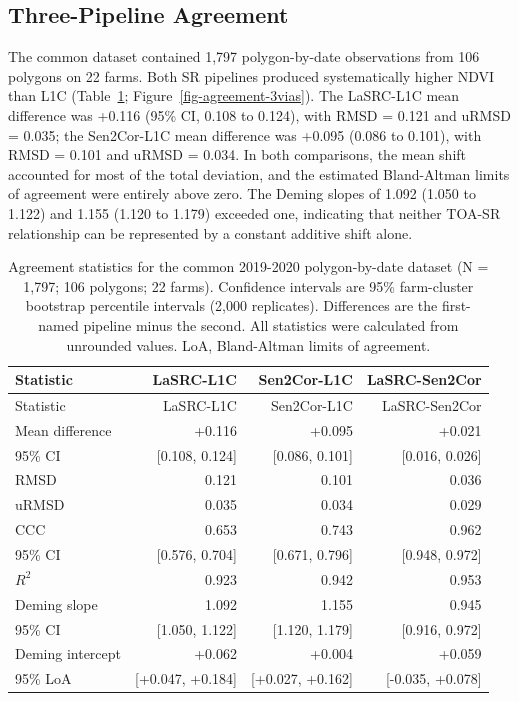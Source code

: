 \documentclass[
  authoryear,
  preprint]{elsarticle}
\begin{document}
\subsection{Three-Pipeline
Agreement}\label{sec-three-pipeline-agreement}

The common dataset contained 1,797 polygon-by-date observations from 106
polygons on 22 farms. Both SR pipelines produced systematically higher
NDVI than L1C (Table~\ref{tbl-agreement-3vias};
Figure~\ref{fig-agreement-3vias}). The LaSRC-L1C mean difference was
+0.116 (95\% CI, 0.108 to 0.124), with RMSD = 0.121 and uRMSD = 0.035;
the Sen2Cor-L1C mean difference was +0.095 (0.086 to 0.101), with RMSD =
0.101 and uRMSD = 0.034. In both comparisons, the mean shift accounted
for most of the total deviation, and the estimated Bland-Altman limits
of agreement were entirely above zero. The Deming slopes of 1.092 (1.050
to 1.122) and 1.155 (1.120 to 1.179) exceeded one, indicating that
neither TOA-SR relationship can be represented by a constant additive
shift alone.

\begin{longtable}[]{@{}lrrr@{}}
\caption{Agreement statistics for the common 2019-2020 polygon-by-date
dataset (N = 1,797; 106 polygons; 22 farms). Confidence intervals are
95\% farm-cluster bootstrap percentile intervals (2,000 replicates).
Differences are the first-named pipeline minus the second. All
statistics were calculated from unrounded values. LoA, Bland-Altman
limits of agreement.}\label{tbl-agreement-3vias}\tabularnewline
\toprule\noalign{}
Statistic & LaSRC-L1C & Sen2Cor-L1C & LaSRC-Sen2Cor \\
\midrule\noalign{}
\endfirsthead
\toprule\noalign{}
Statistic & LaSRC-L1C & Sen2Cor-L1C & LaSRC-Sen2Cor \\
\midrule\noalign{}
\endhead
\bottomrule\noalign{}
\endlastfoot
Mean difference & +0.116 & +0.095 & +0.021 \\
95\% CI & {[}0.108, 0.124{]} & {[}0.086, 0.101{]} & {[}0.016,
0.026{]} \\
RMSD & 0.121 & 0.101 & 0.036 \\
uRMSD & 0.035 & 0.034 & 0.029 \\
CCC & 0.653 & 0.743 & 0.962 \\
95\% CI & {[}0.576, 0.704{]} & {[}0.671, 0.796{]} & {[}0.948,
0.972{]} \\
\(R^2\) & 0.923 & 0.942 & 0.953 \\
Deming slope & 1.092 & 1.155 & 0.945 \\
95\% CI & {[}1.050, 1.122{]} & {[}1.120, 1.179{]} & {[}0.916,
0.972{]} \\
Deming intercept & +0.062 & +0.004 & +0.059 \\
95\% LoA & {[}+0.047, +0.184{]} & {[}+0.027, +0.162{]} & {[}-0.035,
+0.078{]} \\
\end{longtable}
\end{document}
